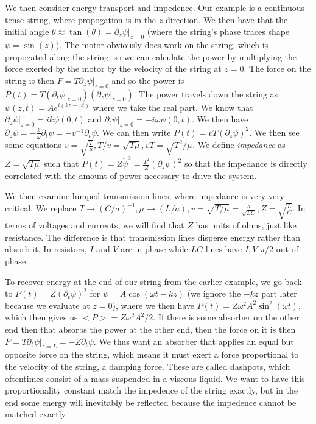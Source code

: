 \documentclass{report}
\begin{document}
We then consider energy transport and impedence. Our example is a continuous tense string, where propogation is in the $z$ direction. We then have that the initial angle $\theta \approx \tan(\theta) = \partial_z\psi |_{z=0}$ (where the string's phase traces shape $\psi = \sin(z)$). The motor obviously does work on the string, which is propogated along the string, so we can calculate the power by multiplying the force exerted by the motor by the velocity of the string at $z=0$. The force on the string is then $F = T \partial_z\psi |_{z=0}$ and so the power is $P(t) = T (\partial_t\psi|_{z=0})(\partial_z\psi|_{z=0})$. The power travels down the string as $\psi(z,t) = Ae^{i(kz - \omega t)}$ where we take the real part. We know that $\partial_z\psi |_{z=0} = ik\psi(0,t)$ and $\partial_t\psi|_{z=0} = -i\omega\psi(0,t)$. We then have $\partial_z\psi = -\frac{k}{\omega}\partial_t\psi = -v^{-1}\partial_t\psi$. We can then write $P(t) = vT(\partial_z\psi)^2$. We then see some equations $v = \sqrt{\frac{T}{\mu}}, T/v = \sqrt{T\mu}, vT = \sqrt{T^2/\mu}$. We define \emph{impedance} as $Z = \sqrt{T\mu}$ such that $P(t) = Z\dot{\psi}^2 = \frac{T^2}{Z}(\partial_z\psi)^2$ so that the impedance is directly correlated with the amount of power necessary to drive the system.

We then examine lumped transmission lines, where impedance is very very critical. We replace $T \to (C/a)^{-1}, \mu \to (L/a), v = \sqrt{T/\mu} = \frac{a}{\sqrt{LC}}, Z = \sqrt{\frac{L}{C}}$. In terms of voltages and currents, we will find that $Z$ has units of ohms, just like resistance. The difference is that transmission lines disperse energy rather than absorb it. In resistors, $I$ and $V$ are in phase while $LC$ lines have $I,V$ $\pi/2$ out of phase.

To recover energy at the end of our string from the earlier example, we go back to $P(t) = Z(\partial_t\psi)^2$ for $\psi = A\cos(\omega t - kz)$ (we ignore the $-kz$ part later because we evaluate at $z=0$), where we then have $P(t) = Z\omega^2A^2\sin^2(\omega t)$, which then gives us $<P> = Z\omega^2A^2/2$. If there is some absorber on the other end then that absorbs the power at the other end, then the force on it is then $F = T\partial_t\psi |_{z = L} = -Z\partial_t\psi$. We thus want an absorber that applies an equal but opposite force on the string, which means it must exert a force proportional to the velocity of the string, a damping force. These are called dashpots, which oftentimes consist of a mass suspended in a viscous liquid. We want to have this proportionality constant match the impedence of the string exactly, but in the end some energy will inevitably be reflected because the impedence cannot be matched exactly. 
\end{document}
